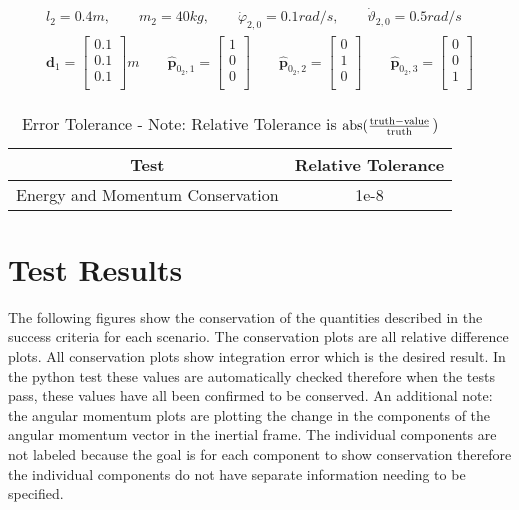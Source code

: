 \begin{align}
\begin{split}
l_2=0.4 m, \qquad m_2=40 kg, \qquad \dot{\varphi}_{2,0}=0.1 rad/s, \qquad \dot{\vartheta}_{2,0}= 0.5 rad/s \\
\bm{d}_1=
\begin{bmatrix}
0.1 \\
0.1 \\
0.1\\
\end{bmatrix} m
\qquad
\bm{\hat{p}}_{0_2,1}=
\begin{bmatrix}
1 \\
0 \\
0\\
\end{bmatrix}
\qquad
\bm{\hat{p}}_{0_2,2}=
\begin{bmatrix}
0 \\
1 \\
0\\
\end{bmatrix}
\qquad
\bm{\hat{p}}_{0_2,3}=
\begin{bmatrix}
0 \\
0 \\
1 \\
\end{bmatrix}
\end{split}
\end{align}

\begin{table}[htbp]
	\caption{Error Tolerance - Note: Relative Tolerance is $\textnormal{abs}(\frac{\textnormal{truth} - \textnormal{value}}{\textnormal{truth}}$)}
	\label{tab:errortol}
	\centering \fontsize{10}{10}\selectfont
	\begin{tabular}{| c | c |} %
		\hline
		Test   & Relative Tolerance \\
		\hline
		Energy and Momentum Conservation & 1e-8 \\
		\hline	
	\end{tabular}
\end{table}

\section{Test Results}

The following figures show the conservation of the quantities described in the success criteria for each scenario. The conservation plots are all relative difference plots. All conservation plots show integration error which is the desired result. In the python test these values are automatically checked therefore when the tests pass, these values have all been confirmed to be conserved. An additional note: the angular momentum plots are plotting the change in the components of the angular momentum vector in the inertial frame. The individual components are not labeled because the goal is for each component to show conservation therefore the individual components do not have separate information needing to be specified.  


